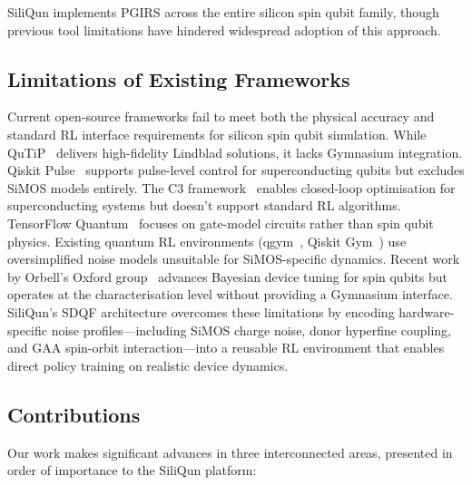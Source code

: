 SiliQun implements PGIRS across the entire silicon spin qubit family, though previous tool limitations have hindered widespread adoption of this approach.

\subsection{Limitations of Existing Frameworks}
\label{subsec:intro_limitations}

Current open-source frameworks fail to meet both the physical accuracy and standard RL interface requirements for silicon spin qubit simulation. While QuTiP~\cite{Johansson2012,Johansson2013} delivers high-fidelity Lindblad solutions, it lacks Gymnasium integration. Qiskit Pulse~\cite{Alexander2020} supports pulse-level control for superconducting qubits but excludes SiMOS models entirely. The C3 framework~\cite{Wittler2021} enables closed-loop optimisation for superconducting systems but doesn't support standard RL algorithms. TensorFlow Quantum~\cite{Broughton2020} focuses on gate-model circuits rather than spin qubit physics. Existing quantum RL environments (qgym~\cite{VanDerLinde2023}, Qiskit Gym~\cite{QiskitGym2024}) use oversimplified noise models unsuitable for SiMOS-specific dynamics. Recent work by Orbell's Oxford group~\cite{Orbell2024} advances Bayesian device tuning for spin qubits but operates at the characterisation level without providing a Gymnasium interface. SiliQun's SDQF architecture overcomes these limitations by encoding hardware-specific noise profiles—including SiMOS charge noise, donor hyperfine coupling, and GAA spin-orbit interaction—into a reusable RL environment that enables direct policy training on realistic device dynamics.

\subsection{Contributions}
\label{subsec:contributions}

Our work makes significant advances in three interconnected areas, presented in order of importance to the SiliQun platform:

